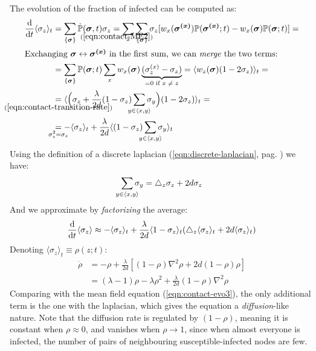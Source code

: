 \documentclass[../../main.tex]{subfiles}
\begin{document}
The evolution of the fraction of infected can be computed as:
\begin{align*}
    \dv{t} \langle \sigma_z \rangle_t &= \sum_{\{\bm{\sigma}\}} \dot{\mathbb{P}}(\bm{\sigma},t) \sigma_z \underset{\mathclap{(\ref{eqn:contact-ME2})}}{=}  
    \sum_x \sum_{\{\bm{\sigma}\}} \sigma_z [w_x(\bm{\sigma^{(x)}}) \mathbb{P}(\bm{\sigma^{(x)}};t) - w_x(\bm{\sigma}) \mathbb{P}(\bm{\sigma};t)] =\\
    \intertext{Exchanging $\bm{\sigma} \leftrightarrow \bm{\sigma^{(x)}}$ in the first sum, we can \textit{merge} the two terms:}
    &= \sum_{\{\bm{\sigma}\}} \mathbb{P}(\bm{\sigma}; t) \sum_x w_x(\bm{\sigma}) \underbrace{(\sigma_z^{(x)} - \sigma_z)}_{\mathclap{= 0 \text{ if $x \neq z$}}} = \langle w_z(\bm{\sigma}) (1-2\sigma_z) \rangle_t =\\
    &\underset{\mathclap{(\ref{eqn:contact-transition-rate})}}{=} \langle \Big(\sigma_z + \frac{\lambda}{2d} (1-\sigma_z) \sum_{\mathclap{y \in \langle x,y \rangle}} \sigma_y  \Big)(1 - 2 \sigma_z) \rangle_t =\\
    &\underset{\mathclap{\sigma_z^2 = \sigma_z}}{=} - \langle \sigma_z \rangle_t + \frac{\lambda}{2d} \langle (1-\sigma_z) \sum_{\mathclap{y \in \langle x,y \rangle}} \sigma_y \rangle_t 
\end{align*}
Using the definition of a discrete laplacian (\ref{eqn:discrete-laplacian}, pag. \pageref{eqn:discrete-laplacian}) we have:
\begin{align*}
    \sum_{\mathclap{y \in \langle x,y \rangle}} \sigma_y = \bigtriangleup_z \sigma_z + 2 d \sigma_z
\end{align*}
And we approximate by \textit{factorizing} the average: 
\begin{align*}
    \dv{t} \langle \sigma_z \rangle \approx - \langle \sigma_z \rangle_t + \frac{\lambda}{2d} \langle 1 - \sigma_z \rangle_t (\bigtriangleup_z \langle \sigma_z \rangle_t + 2d \langle \sigma_z \rangle_t)
\end{align*}
Denoting $\langle \sigma_z \rangle_t \equiv \rho(z;t)$:
\begin{align}\nonumber
    \dot{\rho} &= - \rho + \frac{\lambda}{2d} \left[(1-\rho) \nabla^2 \rho + 2d (1-\rho)\rho\right] \\
    &= (\lambda - 1) \rho - \lambda \rho^2 + \frac{\lambda}{2d} (1 - \rho) \nabla^2 \rho \label{eqn:contact-evo4} 
\end{align}
Comparing with the mean field equation (\ref{eqn:contact-evo3}), the only additional term is the one with the laplacian, which gives the equation a \textit{diffusion}-like nature. Note that the diffusion rate is regulated by $(1-\rho)$, meaning it is constant when $\rho \approx 0$, and vanishes when $\rho \to 1$, since when almost everyone is infected, the number of pairs of neighbouring susceptible-infected nodes are few.
\end{document}

